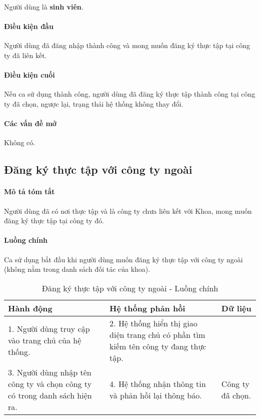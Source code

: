 \documentclass[./../main.tex]{subfiles}
\begin{document}
Người dùng là \textbf{sinh viên}.

\paragraph*{Điều kiện đầu}

Người dùng đã đăng nhập thành công và mong muốn đăng ký thực tập tại
công ty đã liên kết.

\paragraph*{Điều kiện cuối}

Nếu ca sử dụng thành công, người dùng đã đăng ký thực tập thành công tại
công ty đã chọn, ngược lại, trạng thái hệ thống không thay đổi.

\paragraph*{Các vấn đề mở}

Không có.

\subsection{Đăng ký thực tập với công ty ngoài}

\paragraph*{Mô tả tóm tắt}

Người dùng đã có nơi thực tập và là công ty chưa liên kết với Khoa, mong
muốn đăng ký thực tập tại công ty đó.

\paragraph*{Luồng chính} Ca sử dụng bắt đầu khi người dùng muốn đăng ký thực tập với công ty ngoài (không nằm trong danh sách đối tác của khoa).

\begin{table}[H]
  \caption{Đăng ký thực tập với công ty ngoài - Luồng chính}
  \label{tab:register_other_company}
  \begin{tabularx}{\textwidth}{|X|X|X|}
  \hline
  \textbf{Hành động}                                                      & \textbf{Hệ thống phản hồi}                                                        & \textbf{Dữ liệu} \\ \hline
  1. Người dùng truy cập vào trang chủ của hệ thống.                         & 2. Hệ thống hiển thị giao diện trang chủ có phần tìm kiếm tên công ty đang thực tập. &                  \\ \hline
  3. Người dùng nhập tên công ty và chọn công ty có trong danh sách hiện ra. & 4. Hệ thống nhận thông tin và phản hồi lại thông báo.                                & Công ty đã chọn. \\ \hline
  \end{tabularx}
\end{table}
\end{document}
